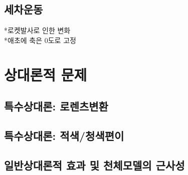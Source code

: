 \documentclass[9pt]{amsbook}
\begin{document}
\section{세차운동}
*로켓발사로 인한 변화
\\*애초에 축은 0도로 고정
\chapter{상대론적 문제}
\section{특수상대론: 로렌츠변환}
\section{특수상대론: 적색/청색편이}
\section{일반상대론적 효과 및 천체모델의 근사성}



\backmatter
\backpage
\end{document}
